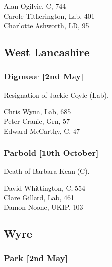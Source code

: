 \documentclass[a4paper,openany,10pt]{book}
\begin{document}
Alan Ogilvie, C, 744\\
Carole Titherington, Lab, 401\\
Charlotte Ashworth, LD, 95\\


\subsection*{West Lancashire}

\subsubsection*{Digmoor \hspace*{\fill}\nolinebreak[1]%
\enspace\hspace*{\fill}
[2nd May]}


Resignation of Jackie Coyle (Lab).



Chris Wynn, Lab, 685\\
Peter Cranie, Grn, 57\\
Edward McCarthy, C, 47\\


\subsubsection*{Parbold \hspace*{\fill}\nolinebreak[1]%
\enspace\hspace*{\fill}
[10th October]}


Death of Barbara Kean (C).



David Whittington, C, 554\\
Clare Gillard, Lab, 461\\
Damon Noone, UKIP, 103\\


\subsection*{Wyre}

\subsubsection*{Park \hspace*{\fill}\nolinebreak[1]%
\enspace\hspace*{\fill}
[2nd May]}
\end{document}
